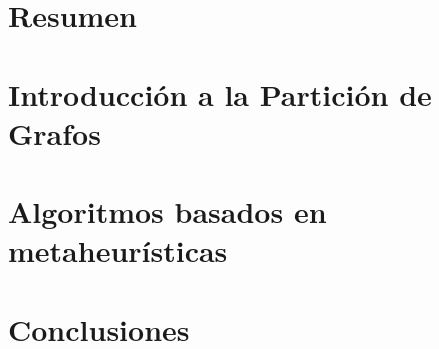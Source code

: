 \documentclass[a4paper,10pt,twoside]{report}
\author{\me}
\begin{document}


\normalsize

\chapter*{Resumen}\label{chapter:Resumen}
\setcounter{page}{0}


\tableofcontents

\chapter{Introducción a la Partición de Grafos}\label{chapter:Introducción}


\chapter{Algoritmos basados en metaheurísticas}\label{chapter:Algoritmos}


%

%

\chapter{Conclusiones}\label{chapter:Conclusiones}






%
\end{document}
